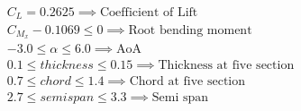$$  
\begin{aligned} 
C_{L} = {0.2625} \implies \text{Coefficient of Lift} \\ 
{C_{M_{x}}-0.1069 \leq 0} \implies \text{Root bending moment}\\
{-3.0} \leq \alpha \leq 6.0 \implies \text{AoA} \\
0.1  \leq thickness \leq 0.15 \implies \text{Thickness at five section}\\
0.7  \leq chord \leq 1.4 \implies \text{Chord at five section}\\
{2.7 \leq semi span \leq 3.3} \implies \text{Semi span}\\ 
\end{aligned}
$$ 